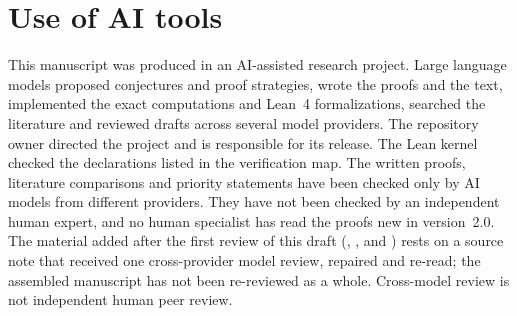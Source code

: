 \documentclass[11pt]{article}
\begin{document}
\section{Use of AI tools}

This manuscript was produced in an AI-assisted research project. Large language models proposed
conjectures and proof strategies, wrote the proofs and the text, implemented the exact computations
and Lean~4 formalizations, searched the literature and reviewed drafts across several model
providers. The repository owner directed the project and is responsible for its release. The Lean
kernel checked the declarations listed in the verification map. The written proofs, literature
comparisons and priority statements have been checked only by AI models from different providers.
They have not been checked by an independent human expert, and no human specialist has read the proofs
new in version~2.0. The material added after the first review of this draft (,
, 
and ) rests on a source note that received one cross-provider model review, repaired and
re-read; the assembled manuscript has not been re-reviewed as a whole. Cross-model review is not independent
human peer review.



\end{document}
